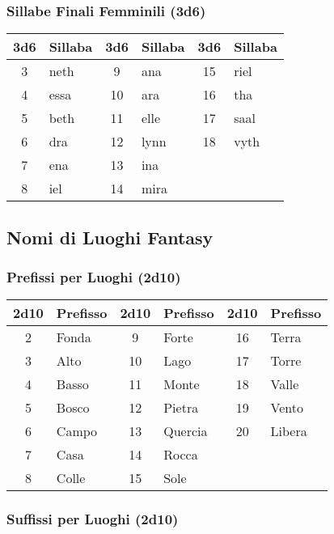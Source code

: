 \begin{multicols}{2}
{\subsubsection*{Sillabe Finali Femminili (3d6)}
\noindent\begin{tabular}{c|l|c|l|c|l}
	\toprule
\textbf{3d6} & \textbf{Sillaba} & \textbf{3d6} & \textbf{Sillaba} & \textbf{3d6} & \textbf{Sillaba} \\
\toprule
3 & neth & 9 & ana & 15 & riel \\
4 & essa & 10 & ara & 16 & tha \\
5 & beth & 11 & elle & 17 & saal \\
6 & dra & 12 & lynn & 18 & vyth \\
7 & ena & 13 & ina & & \\
8 & iel & 14 & mira & & \\

\end{tabular}


\subsection*{Nomi di Luoghi Fantasy}

\subsubsection*{Prefissi per Luoghi (2d10)}
\noindent\begin{tabular}{c|l|c|l|c|l}
	\toprule

	\textbf{2d10} & \textbf{Prefisso} & \textbf{2d10} & \textbf{Prefisso} & \textbf{2d10} & \textbf{Prefisso} \\
\toprule
	2 & Fonda & 9 & Forte & 16 & Terra \\
	3 & Alto & 10 & Lago & 17 & Torre \\
	4 & Basso & 11 & Monte & 18 & Valle \\
	5 & Bosco & 12 & Pietra & 19 & Vento \\
	6 & Campo & 13 & Quercia & 20 & Libera \\
	7 & Casa & 14 & Rocca & & \\
	8 & Colle & 15 & Sole & & \\

\end{tabular}

\subsubsection*{Suffissi per Luoghi (2d10)}

}
\end{multicols}
